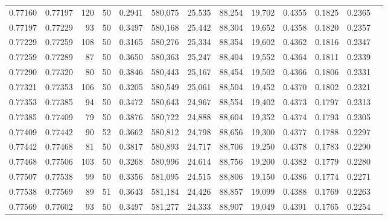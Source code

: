 \begin{tabular}{rrrrrrrrrrrrr}
0.77160 & 0.77197 &   120 &  50 &                                     0.2941 & 580,075 &  25,535 &  88,254 &  19,702 & 0.4355 & 0.1825 & 0.2365 \\
0.77197 & 0.77229 &    93 &  50 &                                     0.3497 & 580,168 &  25,442 &  88,304 &  19,652 & 0.4358 & 0.1820 & 0.2357 \\
0.77229 & 0.77259 &   108 &  50 &                                     0.3165 & 580,276 &  25,334 &  88,354 &  19,602 & 0.4362 & 0.1816 & 0.2347 \\
0.77259 & 0.77289 &    87 &  50 &                                     0.3650 & 580,363 &  25,247 &  88,404 &  19,552 & 0.4364 & 0.1811 & 0.2339 \\
0.77290 & 0.77320 &    80 &  50 &                                     0.3846 & 580,443 &  25,167 &  88,454 &  19,502 & 0.4366 & 0.1806 & 0.2331 \\
0.77321 & 0.77353 &   106 &  50 &                                     0.3205 & 580,549 &  25,061 &  88,504 &  19,452 & 0.4370 & 0.1802 & 0.2321 \\
0.77353 & 0.77385 &    94 &  50 &                                     0.3472 & 580,643 &  24,967 &  88,554 &  19,402 & 0.4373 & 0.1797 & 0.2313 \\
0.77385 & 0.77409 &    79 &  50 &                                     0.3876 & 580,722 &  24,888 &  88,604 &  19,352 & 0.4374 & 0.1793 & 0.2305 \\
0.77409 & 0.77442 &    90 &  52 &                                     0.3662 & 580,812 &  24,798 &  88,656 &  19,300 & 0.4377 & 0.1788 & 0.2297 \\
0.77442 & 0.77468 &    81 &  50 &                                     0.3817 & 580,893 &  24,717 &  88,706 &  19,250 & 0.4378 & 0.1783 & 0.2290 \\
0.77468 & 0.77506 &   103 &  50 &                                     0.3268 & 580,996 &  24,614 &  88,756 &  19,200 & 0.4382 & 0.1779 & 0.2280 \\
0.77507 & 0.77538 &    99 &  50 &                                     0.3356 & 581,095 &  24,515 &  88,806 &  19,150 & 0.4386 & 0.1774 & 0.2271 \\
0.77538 & 0.77569 &    89 &  51 &                                     0.3643 & 581,184 &  24,426 &  88,857 &  19,099 & 0.4388 & 0.1769 & 0.2263 \\
0.77569 & 0.77602 &    93 &  50 &                                     0.3497 & 581,277 &  24,333 &  88,907 &  19,049 & 0.4391 & 0.1765 & 0.2254 \\

\end{tabular}

